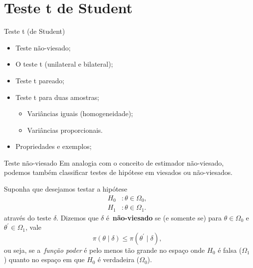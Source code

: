\section{Teste t de Student}
\begin{frame}{Teste t (de Student)}
 \begin{itemize}
   \item Teste não-viesado;
   \item O teste t (unilateral e bilateral);
   \item Teste t pareado;
   \item Teste t para duas amostras;
   \begin{itemize}
    \item Variâncias iguais (homogeneidade);
    \item Variâncias proporcionais.
   \end{itemize}
   \item Propriedades e exemplos;
   \end{itemize}
\end{frame}

\begin{frame}{Teste não-viesado}
 Em analogia com o conceito de estimador não-viesado, podemos também classificar testes de hipótese em viesados ou não-viesados.
 \begin{defn}
  Suponha que desejamos testar a hipótese
  \begin{align*}
   H_0 &: \theta \in \Omega_0, \\
   H_1&:  \theta \in \Omega_1. 
  \end{align*}
  através do teste $\delta$.
  Dizemos que $\delta$ é~\textbf{não-viesado} se (e somente se) para $\theta \in \Omega_0$ e $\theta^\prime \in \Omega_1$, vale 
  \[ \pi(\theta \mid \delta) \leq   \pi(\theta^\prime \mid \delta),\]
  ou seja, se a~\textit{função poder} é pelo menos tão grande no espaço onde $H_0$ é falsa ($\Omega_1$) quanto no espaço em que $H_0$ é verdadeira ($\Omega_0$). 
 \end{defn}
\end{frame}

